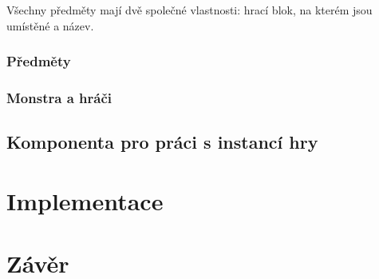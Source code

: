 \documentclass[11pt,a4paper]{scrartcl}
\begin{document}
	Všechny předměty mají dvě společné vlastnosti: hrací blok, na kterém jsou umístěné a název.
	
	\subsubsection{Předměty}
	
	\subsubsection{Monstra a hráči}
	
	
	\subsection{Komponenta pro práci s instancí hry}
	
	\section{Implementace}
	
	 
	\section{Závěr}
	
\end{document}

